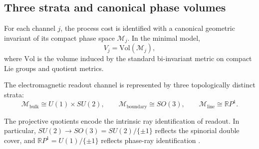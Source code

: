 \subsection{Three strata and canonical phase volumes}
\begin{axiom}\label{ax:impedance_volume_chem}
For each channel $j$, the process cost is identified with a canonical geometric invariant of its compact phase space $\mathcal{M}_j$. In the minimal model,
\begin{equation}
V_j=\mathrm{Vol}(\mathcal{M}_j),
\end{equation}
where $\mathrm{Vol}$ is the volume induced by the standard bi-invariant metric on compact Lie groups and quotient metrics.
\end{axiom}

\begin{axiom}\label{ax:em_phase_spaces_chem}
The electromagnetic readout channel is represented by three topologically distinct strata:
\begin{equation}
\mathcal{M}_{\mathrm{bulk}} \cong U(1)\times SU(2),\qquad
\mathcal{M}_{\mathrm{boundary}} \cong SO(3),\qquad
\mathcal{M}_{\mathrm{line}} \cong \mathbb{R}P^1.
\end{equation}
\end{axiom}
\begin{remark}
The projective quotients encode the intrinsic ray identification of readout. In particular, $SU(2)\to SO(3)=SU(2)/\{\pm 1\}$ reflects the spinorial double cover, and $\mathbb{R}P^1=U(1)/\{\pm 1\}$ reflects phase-ray identification \cite{Nakahara2003,Hall2015}.
\end{remark}

